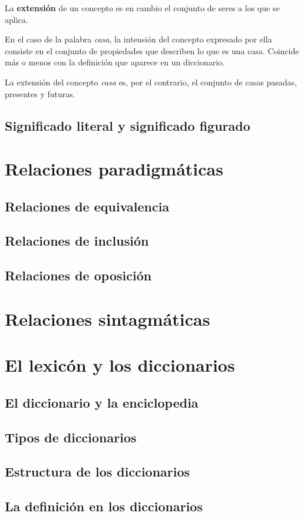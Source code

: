 \documentclass[12pt]{article}
\begin{document}
La \textbf{extensión} de un concepto es en cambio el conjunto de seres a los que se aplica.

En el caso de la palabra \textit{casa}, la intensión del concepto expresado por ella consiste en el conjunto de propiedades que describen lo que es una casa. Coincide más o menos con la definición que aparece en un diccionario.

La extensión del concepto \textit{casa} es, por el contrario, el conjunto de casas pasadas, presentes y futuras.

\subsection{Significado literal y significado figurado}
\section{Relaciones paradigmáticas}
\subsection{Relaciones de equivalencia}
\subsection{Relaciones de inclusión}
\subsection{Relaciones de oposición}
\section{Relaciones sintagmáticas}
\section{El lexicón y los diccionarios}
\subsection{El diccionario y la enciclopedia}
\subsection{Tipos de diccionarios}
\subsection{Estructura de los diccionarios}
\subsection{La definición en los diccionarios}



\end{document}
